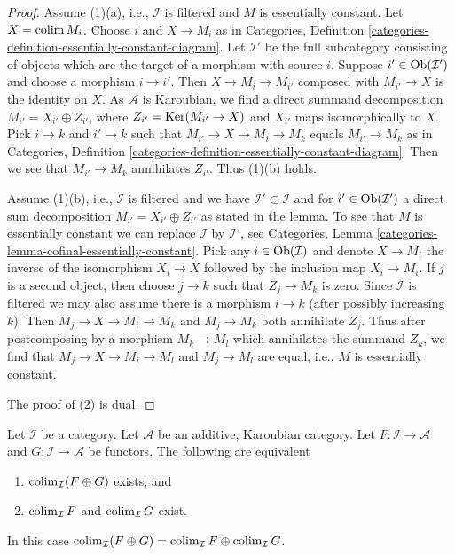 \begin{proof}
Assume (1)(a), i.e., $\mathcal{I}$ is filtered and $M$ is essentially
constant. Let $X = \mathop{\mathrm{colim}}\nolimits M_i$. Choose $i$ and $X \to M_i$ as in
Categories, Definition
\ref{categories-definition-essentially-constant-diagram}.
Let $\mathcal{I}'$ be the full subcategory consisting of objects
which are the target of a morphism with source $i$.
Suppose $i' \in \mathop{\mathrm{Ob}}\nolimits(\mathcal{I}')$ and choose a morphism $i \to i'$.
Then $X \to M_i \to M_{i'}$ composed with $M_{i'} \to X$ is the identity
on $X$. As $\mathcal{A}$ is Karoubian, we find a direct summand
decomposition $M_{i'} = X_{i'} \oplus Z_{i'}$, where
$Z_{i'} = \mathop{\mathrm{Ker}}(M_{i'} \to X)$ and $X_{i'}$ maps isomorphically to $X$.
Pick $i \to k$ and $i' \to k$ such that $M_{i'} \to X \to M_i \to M_k$
equals $M_{i'} \to M_k$ as in Categories, Definition
\ref{categories-definition-essentially-constant-diagram}.
Then we see that $M_{i'} \to M_k$ annihilates $Z_{i'}$.
Thus (1)(b) holds.

\medskip\noindent
Assume (1)(b), i.e., $\mathcal{I}$ is filtered and we have
$\mathcal{I}' \subset \mathcal{I}$ and for $i' \in \mathop{\mathrm{Ob}}\nolimits(\mathcal{I}')$
a direct sum decomposition $M_{i'} = X_{i'} \oplus Z_{i'}$
as stated in the lemma. To see that $M$ is essentially constant
we can replace $\mathcal{I}$ by $\mathcal{I}'$, see
Categories, Lemma \ref{categories-lemma-cofinal-essentially-constant}.
Pick any $i \in \mathop{\mathrm{Ob}}\nolimits(\mathcal{I})$
and denote $X \to M_i$ the inverse of the isomorphism $X_i \to X$
followed by the inclusion map $X_i \to M_i$. If $j$ is
a second object, then choose $j \to k$ such that $Z_j \to M_k$ is
zero. Since $\mathcal{I}$ is filtered we may also assume there is
a morphism $i \to k$ (after possibly increasing $k$). Then
$M_j \to X \to M_i \to M_k$ and $M_j \to M_k$ both annihilate $Z_j$.
Thus after postcomposing by a morphism $M_k \to M_l$ which annihilates
the summand $Z_k$, we find that $M_j \to X \to M_i \to M_l$ and
$M_j \to M_l$ are equal, i.e., $M$ is essentially constant.

\medskip\noindent
The proof of (2) is dual.
\end{proof}

\begin{lemma}
\label{lemma-direct-sum-from-product-colimit}
Let $\mathcal{I}$ be a category. Let $\mathcal{A}$ be an additive, Karoubian
category. Let $F : \mathcal{I} \to \mathcal{A}$ and
$G : \mathcal{I} \to \mathcal{A}$ be functors. The following are equivalent
\begin{enumerate}
\item $\mathop{\mathrm{colim}}\nolimits_\mathcal{I}(F \oplus G)$ exists, and
\item $\mathop{\mathrm{colim}}\nolimits_\mathcal{I} F$ and $\mathop{\mathrm{colim}}\nolimits_\mathcal{I} G$ exist.
\end{enumerate}
In this case $\mathop{\mathrm{colim}}\nolimits_\mathcal{I}(F \oplus G) =
\mathop{\mathrm{colim}}\nolimits_\mathcal{I} F \oplus \mathop{\mathrm{colim}}\nolimits_\mathcal{I} G$.
\end{lemma}

